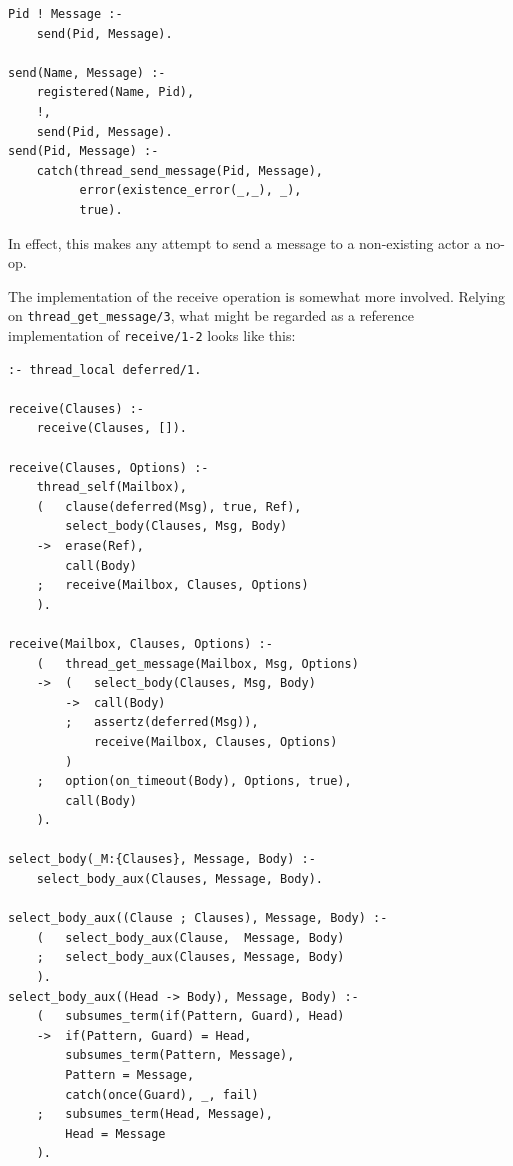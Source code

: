 
\begin{verbatim}
Pid ! Message :-
    send(Pid, Message).

send(Name, Message) :-
    registered(Name, Pid),
    !,
    send(Pid, Message).
send(Pid, Message) :-
    catch(thread_send_message(Pid, Message),
          error(existence_error(_,_), _),
          true).
\end{verbatim}

\noindent In effect, this makes any attempt to send a message to a non-existing actor a no-op. 


The implementation of the receive operation is somewhat more involved. Relying on \texttt{thread\_get\_message/3}, what might be regarded as a reference implementation of \texttt{receive/1-2} looks like this:

\begin{verbatim}
:- thread_local deferred/1.

receive(Clauses) :-
    receive(Clauses, []).

receive(Clauses, Options) :-
    thread_self(Mailbox),
    (   clause(deferred(Msg), true, Ref),
        select_body(Clauses, Msg, Body)
    ->  erase(Ref),
        call(Body)
    ;   receive(Mailbox, Clauses, Options)
    ).

receive(Mailbox, Clauses, Options) :-    
    (   thread_get_message(Mailbox, Msg, Options)
    ->  (   select_body(Clauses, Msg, Body)
        ->  call(Body)
        ;   assertz(deferred(Msg)),
            receive(Mailbox, Clauses, Options)
        )
    ;   option(on_timeout(Body), Options, true),
        call(Body)
    ).

select_body(_M:{Clauses}, Message, Body) :-
    select_body_aux(Clauses, Message, Body).

select_body_aux((Clause ; Clauses), Message, Body) :-
    (   select_body_aux(Clause,  Message, Body)
    ;   select_body_aux(Clauses, Message, Body)
    ).
select_body_aux((Head -> Body), Message, Body) :-
    (   subsumes_term(if(Pattern, Guard), Head)
    ->  if(Pattern, Guard) = Head,
        subsumes_term(Pattern, Message),
        Pattern = Message,
        catch(once(Guard), _, fail)
    ;   subsumes_term(Head, Message),
        Head = Message
    ).
\end{verbatim}

